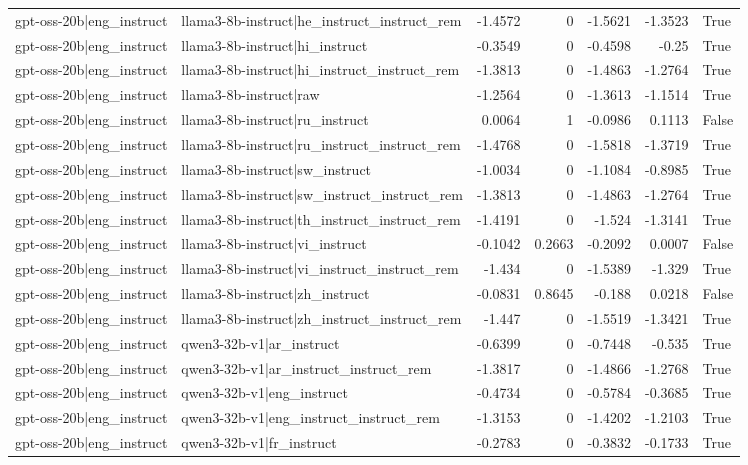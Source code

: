 \begin{table}
\begin{tabular}{l l r r r r l}
gpt-oss-20b|eng_instruct & llama3-8b-instruct|he_instruct_instruct_rem & -1.4572 & 0 & -1.5621 & -1.3523 & True \\
gpt-oss-20b|eng_instruct & llama3-8b-instruct|hi_instruct & -0.3549 & 0 & -0.4598 & -0.25 & True \\
gpt-oss-20b|eng_instruct & llama3-8b-instruct|hi_instruct_instruct_rem & -1.3813 & 0 & -1.4863 & -1.2764 & True \\
gpt-oss-20b|eng_instruct & llama3-8b-instruct|raw & -1.2564 & 0 & -1.3613 & -1.1514 & True \\
gpt-oss-20b|eng_instruct & llama3-8b-instruct|ru_instruct & 0.0064 & 1 & -0.0986 & 0.1113 & False \\
gpt-oss-20b|eng_instruct & llama3-8b-instruct|ru_instruct_instruct_rem & -1.4768 & 0 & -1.5818 & -1.3719 & True \\
gpt-oss-20b|eng_instruct & llama3-8b-instruct|sw_instruct & -1.0034 & 0 & -1.1084 & -0.8985 & True \\
gpt-oss-20b|eng_instruct & llama3-8b-instruct|sw_instruct_instruct_rem & -1.3813 & 0 & -1.4863 & -1.2764 & True \\
gpt-oss-20b|eng_instruct & llama3-8b-instruct|th_instruct_instruct_rem & -1.4191 & 0 & -1.524 & -1.3141 & True \\
gpt-oss-20b|eng_instruct & llama3-8b-instruct|vi_instruct & -0.1042 & 0.2663 & -0.2092 & 0.0007 & False \\
gpt-oss-20b|eng_instruct & llama3-8b-instruct|vi_instruct_instruct_rem & -1.434 & 0 & -1.5389 & -1.329 & True \\
gpt-oss-20b|eng_instruct & llama3-8b-instruct|zh_instruct & -0.0831 & 0.8645 & -0.188 & 0.0218 & False \\
gpt-oss-20b|eng_instruct & llama3-8b-instruct|zh_instruct_instruct_rem & -1.447 & 0 & -1.5519 & -1.3421 & True \\
gpt-oss-20b|eng_instruct & qwen3-32b-v1|ar_instruct & -0.6399 & 0 & -0.7448 & -0.535 & True \\
gpt-oss-20b|eng_instruct & qwen3-32b-v1|ar_instruct_instruct_rem & -1.3817 & 0 & -1.4866 & -1.2768 & True \\
gpt-oss-20b|eng_instruct & qwen3-32b-v1|eng_instruct & -0.4734 & 0 & -0.5784 & -0.3685 & True \\
gpt-oss-20b|eng_instruct & qwen3-32b-v1|eng_instruct_instruct_rem & -1.3153 & 0 & -1.4202 & -1.2103 & True \\
gpt-oss-20b|eng_instruct & qwen3-32b-v1|fr_instruct & -0.2783 & 0 & -0.3832 & -0.1733 & True \\

\end{tabular}
\end{table}

